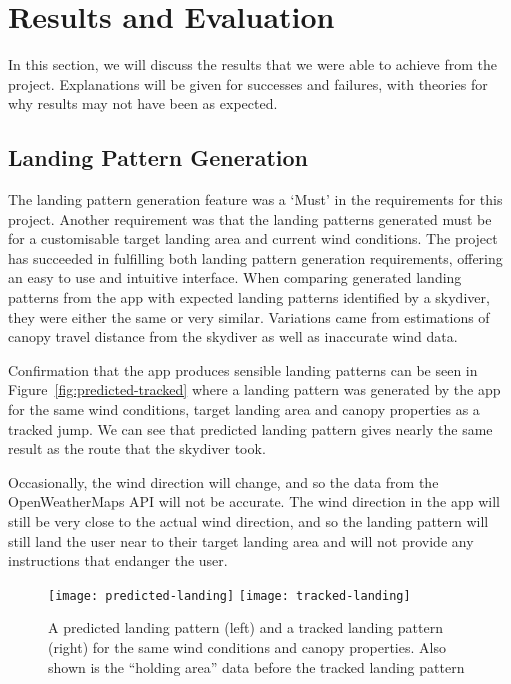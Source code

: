 \section{Results and Evaluation}\label{sec:results-and-evaluation}
In this section, we will discuss the results that we were able to achieve from the project. Explanations will be given for successes and failures, with theories for why results may not have been as expected.


\subsection{Landing Pattern Generation}
The landing pattern generation feature was a `Must' in the requirements for this project. Another requirement was that the landing patterns generated must be for a customisable target landing area and current wind conditions.
The project has succeeded in fulfilling both landing pattern generation requirements, offering an easy to use and intuitive interface.
When comparing generated landing patterns from the app with expected landing patterns identified by a skydiver, they were either the same or very similar. Variations came from estimations of canopy travel distance from the skydiver as well as inaccurate wind data.

Confirmation that the app produces sensible landing patterns can be seen in Figure~\vref{fig:predicted-tracked} where a landing pattern was generated by the app for the same wind conditions, target landing area and canopy properties as a tracked jump. We can see that predicted landing pattern gives nearly the same result as the route that the skydiver took.

Occasionally, the wind direction will change, and so the data from the OpenWeatherMaps API will not be accurate. The wind direction in the app will still be very close to the actual wind direction, and so the landing pattern will still land the user near to their target landing area and will not provide any instructions that endanger the user.

\begin{figure}[ht]
  \centering
  \texttt{[image: predicted-landing]}
  \hspace{1cm}
  \texttt{[image: tracked-landing]}
  \caption{A predicted landing pattern (left) and a tracked landing pattern (right) for the same wind conditions and canopy properties. Also shown is the ``holding area'' data before the tracked landing pattern}\label{fig:predicted-tracked}
\end{figure}

